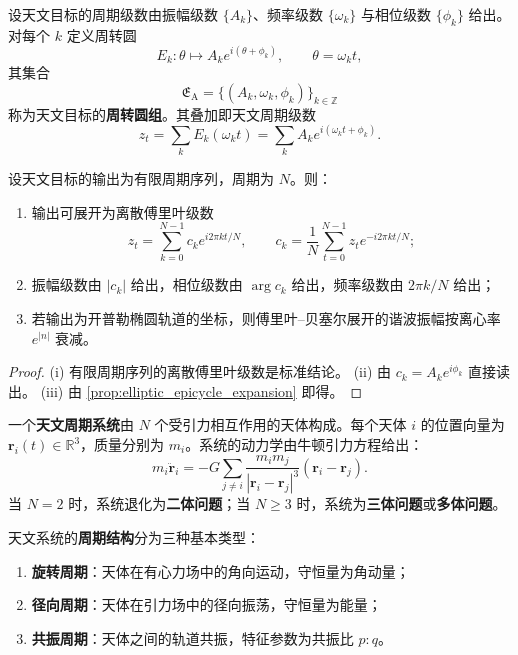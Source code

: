 \begin{definition}[天文周转圆组]\label{def:astro_epicycle_group}
设天文目标的周期级数由振幅级数 \(\{A_k\}\)、频率级数 \(\{\omega_k\}\) 与相位级数 \(\{\phi_k\}\) 给出。对每个 \(k\) 定义周转圆
\[
E_k:\theta\mapsto A_k e^{i(\theta+\phi_k)},\qquad \theta=\omega_k t,
\]
其集合
\[
\mathfrak E_{\mathrm{A}}=\{(A_k,\omega_k,\phi_k)\}_{k\in\mathbb Z}
\]
称为天文目标的\textbf{周转圆组}。其叠加即天文周期级数
\[
z_t=\sum_k E_k(\omega_k t)=\sum_k A_k e^{i(\omega_k t+\phi_k)}.
\]
\end{definition}

\begin{theorem}[由天文数据构建周期级数]\label{thm:astro_series_reconstruction}
设天文目标的输出为有限周期序列，周期为 \(N\)。则：
\begin{enumerate}[label=(\roman*)]
    \item 输出可展开为离散傅里叶级数
    \[
    z_t=\sum_{k=0}^{N-1}c_k e^{i2\pi kt/N},\qquad
    c_k=\frac1N\sum_{t=0}^{N-1}z_t e^{-i2\pi kt/N};
    \]
    \item 振幅级数由 \(|c_k|\) 给出，相位级数由 \(\arg c_k\) 给出，频率级数由 \(2\pi k/N\) 给出；
    \item 若输出为开普勒椭圆轨道的坐标，则傅里叶--贝塞尔展开的谐波振幅按离心率 \(e^{|n|}\) 衰减。
\end{enumerate}
\end{theorem}

\begin{proof}
(i) 有限周期序列的离散傅里叶级数是标准结论。
(ii) 由 \(c_k=A_k e^{i\phi_k}\) 直接读出。
(iii) 由 \cref{prop:elliptic_epicycle_expansion} 即得。
\end{proof}

\begin{definition}[天文周期系统]\label{def:astronomical_periodic_system}
一个\textbf{天文周期系统}由 \(N\) 个受引力相互作用的天体构成。每个天体 \(i\) 的位置向量为 \(\mathbf r_i(t)\in\mathbb R^3\)，质量分别为 \(m_i\)。系统的动力学由牛顿引力方程给出：
\[
m_i\ddot{\mathbf r}_i=-G\sum_{j\neq i}\frac{m_im_j}{|\mathbf r_i-\mathbf r_j|^3}(\mathbf r_i-\mathbf r_j).
\]
当 \(N=2\) 时，系统退化为\textbf{二体问题}；当 \(N\ge3\) 时，系统为\textbf{三体问题}或\textbf{多体问题}。
\end{definition}

\begin{definition}[天文系统的周期结构]\label{def:astronomical_periodic_structure}
天文系统的\textbf{周期结构}分为三种基本类型：
\begin{enumerate}[label=(\roman*)]
    \item \textbf{旋转周期}：天体在有心力场中的角向运动，守恒量为角动量；
    \item \textbf{径向周期}：天体在引力场中的径向振荡，守恒量为能量；
    \item \textbf{共振周期}：天体之间的轨道共振，特征参数为共振比 \(p:q\)。
\end{enumerate}
\end{definition}

